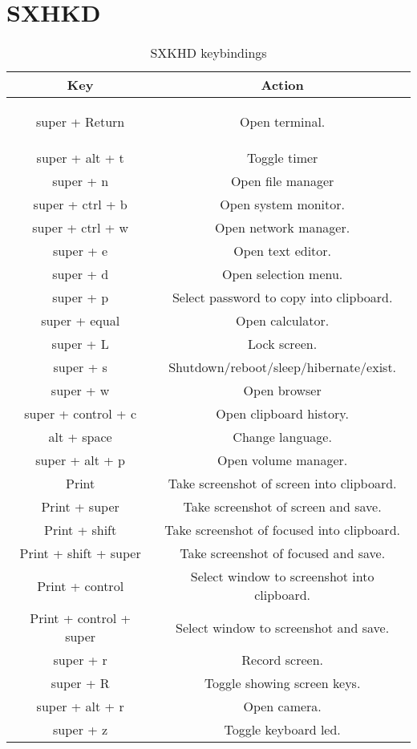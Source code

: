 \section{SXHKD}

\begin{longtable}{|c|c|}

    \caption{SXKHD keybindings}  \\

    \hline
    Key & Action \\
    \hline
    \hline

    \endhead
    \label{tab:sxkhd-keybindings}

    super + Return & Open terminal. \\
    \hline
    super + alt + t & Toggle timer \\
    \hline
    super + n  & Open file manager \\
    \hline
    super + ctrl + b & Open system monitor. \\
    \hline
    super + ctrl + w & Open network manager. \\
    \hline
    super + e & Open text editor. \\
    \hline
    super + d & Open selection menu. \\
    \hline
    super + p & Select password to copy into clipboard. \\
    \hline
    super + equal & Open calculator. \\
    \hline
    super + L & Lock screen. \\
    \hline
    super + s & Shutdown/reboot/sleep/hibernate/exist. \\
    \hline
    super + w & Open browser \\
    \hline
    super + control + c & Open clipboard history. \\
    \hline
    alt + space & Change language. \\
    \hline
    super + alt + p & Open volume manager. \\
    \hline
    Print & Take screenshot of screen into clipboard. \\
    \hline
    Print + super & Take screenshot of screen and save. \\
    \hline
    Print + shift & Take screenshot of focused into clipboard. \\
    \hline
    Print + shift + super & Take screenshot of focused and save. \\
    \hline
    Print + control & Select window to screenshot into clipboard. \\
    \hline
    Print + control + super & Select window to screenshot and save. \\
    \hline
    super + r & Record screen. \\
    \hline
    super + R & Toggle showing screen keys. \\
    \hline
    super + alt + r & Open camera. \\
    \hline
    super + z & Toggle keyboard led. \\
    \hline

\end{longtable}
